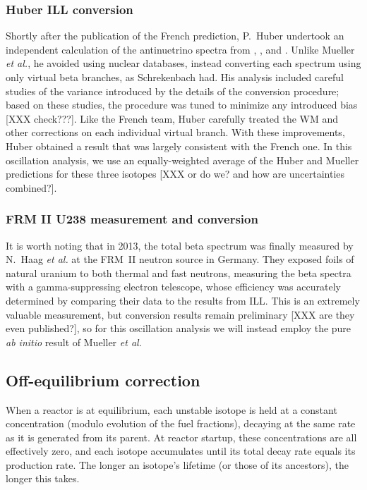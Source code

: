 \documentclass[../thesis.tex]{subfiles}
\begin{document}
\subsubsection{Huber ILL conversion}
\label{sec:huberconv}

Shortly after the publication of the French prediction, P.~Huber undertook an
independent calculation of the antinuetrino spectra from \urfive, \punine, and
\puone. Unlike Mueller \emph{et al.}, he avoided using nuclear databases,
instead converting each spectrum using only virtual beta branches, as
Schrekenbach had. His analysis included careful studies of the variance
introduced by the details of the conversion procedure; based on these studies,
the procedure was tuned to minimize any introduced bias [XXX check???]. Like the
French team, Huber carefully treated the WM and other corrections on each
individual virtual branch. With these improvements, Huber obtained a result that
was largely consistent with the French one. In this oscillation analysis, we use
an equally-weighted average of the Huber and Mueller predictions for these three
isotopes [XXX or do we? and how are uncertainties combined?].

\subsubsection{FRM II U238 measurement and conversion}
\label{sec:u238conv}

It is worth noting that in 2013, the \ureight total beta spectrum was finally
measured by N.~Haag \emph{et al.} at the FRM~II neutron source in Germany. They
exposed foils of natural uranium to both thermal and fast neutrons, measuring
the beta spectra with a gamma-suppressing electron telescope, whose efficiency
was accurately determined by comparing their \urfive data to the results from
ILL. This is an extremely valuable measurement, but conversion results remain
preliminary [XXX are they even published?], so for this oscillation analysis we
will instead employ the pure \emph{ab initio} result of Mueller \emph{et al.}

\subsection{Off-equilibrium correction}
\label{sec:offeqcorr}

When a reactor is at equilibrium, each unstable isotope is held at a constant
concentration (modulo evolution of the fuel fractions), decaying at the same
rate as it is generated from its parent. At reactor startup, these
concentrations are all effectively zero, and each isotope accumulates until its
total decay rate equals its production rate. The longer an isotope's lifetime
(or those of its ancestors), the longer this takes.
\end{document}
